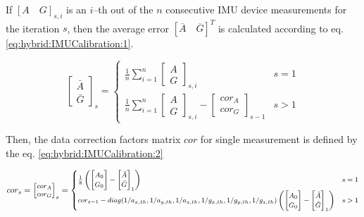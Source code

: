 \documentclass[sensors,article,submit,moreauthors,pdftex,10pt,a4paper]{mdpi}
\begin{document}
	If $[A\quad G]_{s,i}$ is an $i$--th out of the $n$ consecutive IMU device measurements for the iteration $s$, then the average error $[\overline{A}\quad \overline{G}]^T$ is calculated according to eq. \ref{eq:hybrid:IMUCalibration:1}.
		
	\begin{equation}
		\begin{bmatrix} \bar{A} \\ \bar{G} \end{bmatrix}_s =
		\begin{cases}
			\frac{1}{n}\sum_{i=1}^{n}{\begin{bmatrix}A \\ G\end{bmatrix}_{s,i}} & s = 1\\
			\frac{1}{n}\sum_{i=1}^{n}{\begin{bmatrix}A \\ G\end{bmatrix}_{s,i} - \begin{bmatrix}cor_A\\ cor_G\end{bmatrix}_{s-1}} &  s > 1
		\end{cases}
		\label{eq:hybrid:IMUCalibration:1}
	\end{equation}
	
	Then, the data correction factors matrix $cor$ for single measurement is defined by the eq. \ref{eq:hybrid:IMUCalibration:2}
		
	\begin{equation}
		\footnotesize
		cor_s = \begin{bmatrix}cor_A\\ cor_G\end{bmatrix}_s =
		\begin{cases}
			\frac{1}{8}\left(\begin{bmatrix}A_0                                                                          \\ G_0\end{bmatrix} - \begin{bmatrix}\bar{A}\\ \bar{G}\end{bmatrix}_1\right) & s = 1\\
			cor_{s-1} - diag(1/a_{x,th},1/a_{y,th},1/a_{z,th},1/g_{x,th},1/g_{y,th},1/g_{z,th}) \left(\begin{bmatrix}A_0 \\ G_0\end{bmatrix} - \begin{bmatrix}\bar{A}\\ \bar{G}\end{bmatrix}_1\right) & s > 1
		\end{cases}
		\label{eq:hybrid:IMUCalibration:2}
	\end{equation}	
		
\end{document}

